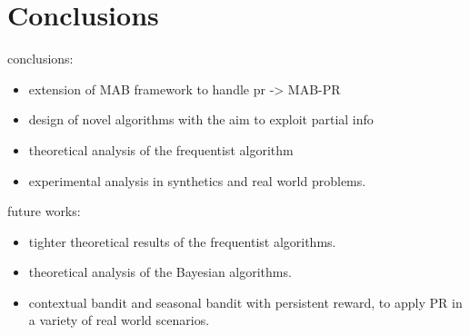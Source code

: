 \chapter{Conclusions}\label{C6}
conclusions: 
\begin{itemize}
	\item extension of MAB framework to handle pr -> MAB-PR
	\item design of novel algorithms with the aim to exploit partial info
	\item theoretical analysis of the frequentist algorithm 
	\item experimental analysis in synthetics and real world problems.
\end{itemize}


future works: 
\begin{itemize}
	\item tighter theoretical results of the frequentist algorithms.
	\item theoretical analysis of the Bayesian algorithms.
	\item contextual bandit and seasonal bandit with persistent reward, to apply PR in a variety of real world scenarios.
\end{itemize}

